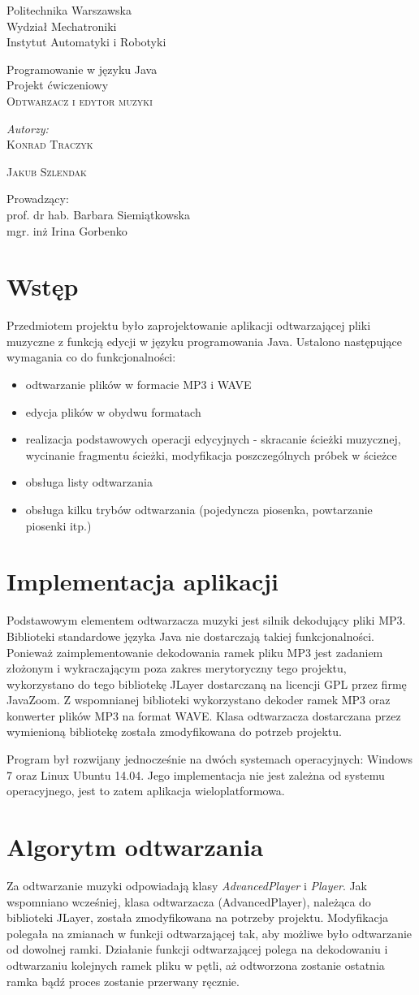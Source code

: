 \documentclass[12pt,a4paper,notitlepage]{article}
\makeatletter
\renewcommand{\maketitle}{\begin{titlepage}

    \vspace*{1cm}

    \begin{center}\small

   	 Politechnika Warszawska\\
    	Wydział Mechatroniki\\
 	Instytut Automatyki i Robotyki
    \end{center}
    \vspace{3cm}


    \begin{center}

	\small
	Programowanie w języku Java \\
	Projekt ćwiczeniowy \\
	
      \LARGE \textsc{Odtwarzacz i edytor muzyki}

         \end{center}


    \vspace{5.5cm}

    \begin{flushright}

    \begin{minipage}{5cm}

    \textit{\small Autorzy:}\\

    \normalsize \textsc{Konrad Traczyk} \par
    \normalsize \textsc{Jakub Szlendak} \par

    \end{minipage}

    \vspace{5cm}

     {\small Prowadzący:}\\
 
         {prof. dr hab. Barbara Siemiątkowska}\\	
         {mgr. inż Irina Gorbenko}

     \end{flushright}

    \vspace*{\stretch{6}}

    \begin{center}

    \@date

    \end{center}

  \end{titlepage}%

}
\makeatother
\begin{document}
\maketitle

\section{Wstęp}
\label{sec:wstep}

Przedmiotem projektu było zaprojektowanie aplikacji odtwarzającej pliki muzyczne z funkcją edycji w języku programowania Java. Ustalono następujące wymagania co do funkcjonalności:
\begin{itemize}
 \item odtwarzanie plików w formacie MP3 i WAVE
 \item edycja plików w obydwu formatach
 \item realizacja podstawowych operacji edycyjnych - skracanie ścieżki muzycznej, wycinanie fragmentu ścieżki, modyfikacja poszczególnych próbek w ścieżce
 \item obsługa listy odtwarzania
 \item obsługa kilku trybów odtwarzania (pojedyncza piosenka, powtarzanie piosenki itp.)
\end{itemize}

\section{Implementacja aplikacji}
\label{sec:implementacja}
Podstawowym elementem odtwarzacza muzyki jest silnik dekodujący pliki MP3. Biblioteki standardowe języka Java nie dostarczają takiej funkcjonalności.
Ponieważ zaimplementowanie dekodowania ramek pliku MP3 jest zadaniem złożonym i wykraczającym poza zakres merytoryczny tego projektu, wykorzystano do tego bibliotekę JLayer dostarczaną na licencji 
GPL przez firmę JavaZoom. Z wspomnianej biblioteki wykorzystano dekoder ramek MP3 oraz konwerter plików MP3 na format WAVE. Klasa odtwarzacza dostarczana przez wymienioną bibliotekę została zmodyfikowana do potrzeb projektu. 

Program był rozwijany jednocześnie na dwóch systemach operacyjnych: Windows 7 oraz Linux Ubuntu 14.04. Jego implementacja nie jest zależna od systemu operacyjnego, jest to zatem aplikacja wieloplatformowa. 

\section{Algorytm odtwarzania}
\label{sec:odtwarzanie}
Za odtwarzanie muzyki odpowiadają klasy \emph{AdvancedPlayer} i \emph{Player}.   
Jak wspomniano wcześniej, klasa odtwarzacza (AdvancedPlayer), należąca do biblioteki JLayer, została zmodyfikowana na potrzeby projektu. Modyfikacja polegała na zmianach w funkcji odtwarzającej tak, 
aby możliwe było odtwarzanie od dowolnej ramki. Działanie funkcji odtwarzającej polega na dekodowaniu i odtwarzaniu kolejnych ramek pliku w pętli, aż odtworzona zostanie ostatnia ramka
bądź proces zostanie przerwany ręcznie. 
\end{document}
